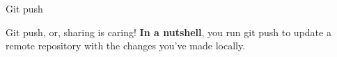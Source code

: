 \begin{frame}{Git push}
    \begin{block}{Git push, or, sharing is caring!}
    \textbf{In a nutshell}, you run git push to update a remote repository with the changes you've made locally. 
    
    \end{block}
    \pause
\end{frame}
